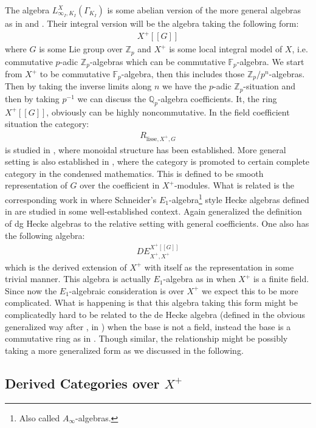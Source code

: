 \documentclass[12pt]{article}
\theoremstyle{definition}
\begin{document}
\indent The algebra $L^X_{\infty_I,K_I}(\Gamma_{K_I})$ is some abelian version of the more general algebras as in \cite{ST} and \cite{Z1}. Their integral version will be the algebra taking the following form:
\begin{align}
X^+[[G]]
\end{align}
where $G$ is some Lie group over $\mathbb{Z}_p$ and $X^+$ is some local integral model of $X$, i.e. commutative $p$-adic $\mathbb{Z}_p$-algebras which can be commutative $\mathbb{F}_p$-algebra. We start from $X^+$ to be commutative $\mathbb{F}_p$-algebra, then this includes those $\mathbb{Z}_p/p^n$-algebras. Then by taking the inverse limits along $n$ we have the $p$-adic $\mathbb{Z}_p$-situation and then by taking $p^{-1}$ we can discuss the $\mathbb{Q}_p$-algebra coefficients. It, the ring $X^+[[G]]$, obviously can be highly noncommutative. In the field coefficient situation the category:
\begin{align}
R_{\mathrm{lisse},X^+,G}
\end{align}
is studied in \cite{SS1}, \cite{SS2} where monoidal structure has been established. More general setting is also established in \cite{HM}, where the category is promoted to certain complete category in the condensed mathematics. This is defined to be smooth representation of $G$ over the coefficient in $X^+$-modules. What is related is the corresponding work in \cite{So1} where Schneider's $E_1$-algebra\footnote{Also called $A_\infty$-algebras.} style Hecke algebras defined in \cite{Sc1} are studied in some well-established context. Again \cite{HM} generalized the definition of dg Hecke algebras to the relative setting with general coefficients. One also has the following algebra:
\begin{align}
DE^{X^+[[G]]}_{X^+,X^+}
\end{align}
which is the derived extension of $X^+$ with itself as the representation in some trivial manner. This algebra is actually $E_1$-algebra as in \cite{So1} when $X^+$ is a finite field. Since now the $E_1$-algebraic consideration is over $X^+$ we expect this to be more complicated. What is happening is that this algebra taking this form might be complicatedly hard to be related to the de Hecke algebra (defined in the obvious generalized way after \cite{Sc1}, in \cite{HM}) when the base is not a field, instead the base is a commutative ring as in \cite{So1}. Though similar, the relationship might be possibly taking a more generalized form as we discussed in the following.

\subsection{Derived Categories over $X^+$}
\end{document}
